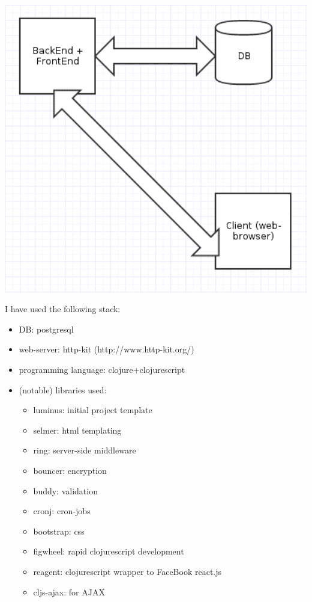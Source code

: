 \documentclass[a4paper, 10pt]{article}
\begin{document}
\includegraphics[width=6in]{implemented.png}

I have used the following stack:
\begin{itemize}
  \item DB: postgresql
  \item web-server: http-kit (http://www.http-kit.org/)
  \item programming language: clojure+clojurescript
  \item (notable) libraries used:
    \begin{itemize}
    \item luminus: initial project template
    \item selmer: html templating
    \item ring: server-side middleware
    \item bouncer: encryption
    \item buddy: validation
    \item cronj: cron-jobs
    \item bootstrap: css
    \item figwheel: rapid clojurescript development
    \item reagent: clojurescript wrapper to FaceBook react.js
    \item cljs-ajax: for AJAX
    \end{itemize}
\end{itemize}
\end{document}
